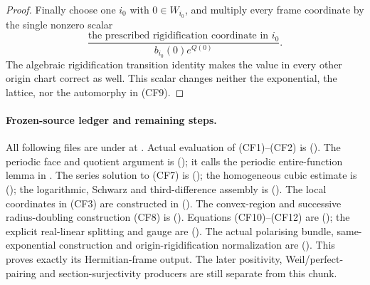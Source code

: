\begin{proof}
Finally choose one \(i_0\) with \(0\in W_{i_0}\), and multiply every
frame coordinate by the single nonzero scalar
\[
 \frac{\text{the prescribed rigidification coordinate in }i_0}
                  {b_{i_0}(0)e^{Q(0)}}.
\]
The algebraic rigidification transition identity makes the value in
every other origin chart correct as well.  This scalar changes
neither the exponential, the lattice, nor the automorphy in (CF9).
\end{proof}

\paragraph{Frozen-source ledger and remaining steps.}
All following files are under
at .
Actual evaluation of (CF1)--(CF2) is
().
The periodic face and quotient argument is
();
it calls the periodic entire-function lemma in
.
The series solution to (CF7) is
();
the homogeneous cubic estimate is
();
the logarithmic, Schwarz and third-difference assembly is
().
The local coordinates in (CF3) are constructed in
().
The convex-region and successive radius-doubling construction
(CF8) is 
().
Equations (CF10)--(CF12) are
();
the explicit real-linear splitting and gauge are
().
The actual polarising bundle, same-exponential construction and
origin-rigidification normalization are
().
This proves exactly its Hermitian-frame output.
The later positivity, Weil/perfect-pairing and section-surjectivity
producers are still separate from this chunk.

